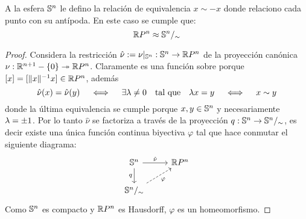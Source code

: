 \begin{ejercicio}\label{ej:20}
  A la esfera $\mathbb{S}^n$ le defino la relaci\'on de equivalencia $x\sim -x$ donde relaciono cada punto
  con su ant\'ipoda. En este caso se cumple que:
  \[
    \mathbb{R} P^n\approx \mathbb{S}^n/_{\sim}
  \]
\end{ejercicio}

\begin{proof}%
  Considera la restricci\'on $\hat{\nu}:=\nu|_{\mathbb{S}^n}:\mathbb{S}^n\rightarrow \mathbb{R} P^n$ de la proyecci\'on can\'onica
  $\nu:\mathbb{R}^{n+1}-\{0\}\twoheadrightarrow \mathbb{R} P^n$. Claramente es una funci\'on sobre porque
  $[x]=[\|x\|^{-1}x]\in\mathbb{R} P^n$, adem\'as
  \[
    \hat{\nu}(x)=\hat{\nu}(y) \quad\iff\quad
    \exists\lambda\neq 0 \quad\text{tal que}\quad
    \lambda x= y \quad\iff\quad x\sim y
  \]
  donde la \'ultima equivalencia se cumple porque $x,y\in\mathbb{S}^n$ y necesariamente $\lambda=\pm 1$.
  Por lo tanto $\hat{\nu}$ se factoriza a trav\'es de la proyecci\'on $q:\mathbb{S}^n\rightarrow \mathbb{S}^n/_{\sim}$,
  es decir existe una \'unica funci\'on continua biyectiva $\varphi$ tal que hace conmutar el
  siguiente diagrama:
  \[
    \begin{tikzcd}
      \Sn^n \arrow[r,"\hat{\nu}"] \arrow[d,"q"'] & \RR P^n \\
      \Sn^n/_{\sim} \arrow[ur,dashed,"\varphi"'] & 
    \end{tikzcd}
  \]
  Como $\mathbb{S}^n$ es compacto y $\mathbb{R} P^n$ es Hausdorff, $\varphi$ es un homeomorfismo.   
\end{proof}%


